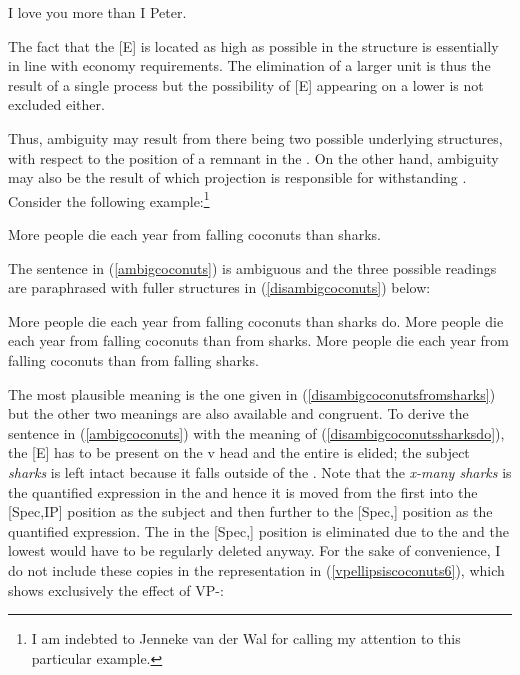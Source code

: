 \ea	*I love you more than I Peter. \label{illicitgapping}
\z

The fact that the  [E] is located as high as possible in the structure is essentially in line with economy requirements. The elimination of a larger unit is thus the result of a single process but the possibility of [E] appearing on a lower  is not excluded either.

Thus, ambiguity may result from there being two possible underlying structures, with respect to the position of a remnant  in the . On the other hand, ambiguity may also be the result of which projection is responsible for withstanding . Consider the following example:\footnote{I am indebted to Jenneke van der Wal for calling my attention to this particular example.}

\ea More people die each year from falling coconuts than sharks. \label{ambigcoconuts}
\z

The sentence in (\ref{ambigcoconuts}) is ambiguous and the three possible readings are paraphrased with fuller structures in (\ref{disambigcoconuts}) below:

\ea \label{disambigcoconuts}
\ea	More people die each year from falling coconuts than sharks do. \label{disambigcoconutssharksdo}
\ex	More people die each year from falling coconuts than from sharks. \label{disambigcoconutsfromsharks}
\ex	More people die each year from falling coconuts than from falling sharks. \label{disambigcoconutsfallingsharks}
\z
\z

The most plausible meaning is the one given in (\ref{disambigcoconutsfromsharks}) but the other two meanings are also available and congruent. To derive the sentence in (\ref{ambigcoconuts}) with the meaning of (\ref{disambigcoconutssharksdo}), the [E]  has to be present on the v head and the entire  is elided; the subject  \textit{sharks} is left intact because it falls outside of the . Note that the  \textit{x-many sharks} is the quantified expression in the  and hence it is moved from the  first into the [Spec,IP] position as the subject and then further to the [Spec,] position as the quantified expression. The  in the [Spec,] position is eliminated due to the  and the lowest  would have to be regularly deleted anyway. For the sake of convenience, I do not include these copies in the representation in (\ref{vpellipsiscoconuts6}), which shows exclusively the effect of VP-:

